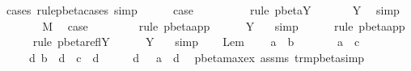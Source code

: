 \begin{isabellebody}
\ {\isacharparenleft}cases\ rule{\isacharcolon}pbeta{\isachardot}cases{\isacharcomma}\ simp{\isacharparenright}\isanewline
\ \ \ \ \isamarkupfalse%
\ {\isacharquery}case\ \isamarkupfalse%
\ {}\ {}\isanewline
\ \ \ \ \isamarkupfalse%
\ {\isacharparenleft}rule\ pbeta{\isachardot}Y{\isacharparenright}\isanewline
\ \ \ \ \isamarkupfalse%
\ {}\ Y\ \isamarkupfalse%
\ simp\isanewline
\ \ \isamarkupfalse%
\isanewline
\ \ \isamarkupfalse%
\ {\isacharparenleft}{}\ M{\isacharprime}{\isacharprime}{\isacharparenright}\ \isamarkupfalse%
\ {\isacharquery}case\ \isamarkupfalse%
\ {}\isanewline
\ \ \ \ \isamarkupfalse%
\ {\isacharparenleft}rule\ pbeta{\isachardot}app{\isacharparenright}\isanewline
\ \ \ \ \isamarkupfalse%
\ Y\ {}\ \isamarkupfalse%
\ simp\isanewline
\ \ \ \ \isamarkupfalse%
\ {\isacharparenleft}rule\ pbeta{\isachardot}app{\isacharparenright}\isanewline
\ \ \ \ \isamarkupfalse%
\ {\isacharparenleft}rule\ pbeta{\isachardot}reflY{\isacharparenright}\isanewline
\ \ \ \ \isamarkupfalse%
\ Y\ {}\ \isamarkupfalse%
\ simp\isanewline
\ \ \isamarkupfalse%
\isanewline
{}\isamarkupfalse%
%
\endisatagproof
{\isafoldproof}%
%
\isadelimproof
%
\endisadelimproof
%
\isamarkuptrue%
\isamarkupfalse%
\ Lem{}{\isacharunderscore}{}{\isacharunderscore}{}{\isacharcolon}\ \isanewline
\ \ \ {\isachardoublequoteopen}a\ {\isasymggreater}\ b{\isachardoublequoteclose}\isanewline
\ \ \ \ \ \ \ {\isachardoublequoteopen}a\ {\isasymggreater}\ c{\isachardoublequoteclose}\isanewline
\ \ \ \ \ {\isachardoublequoteopen}{\isasymexists}d{\isachardot}\ b\ {\isasymggreater}\ d\ {\isasymand}\ c\ {\isasymggreater}\ d{\isachardoublequoteclose}\isanewline
%
\isadelimproof
%
\endisadelimproof
%
\isatagproof
{}\isamarkupfalse%
\ {\isacharminus}\isanewline
\ \ \isamarkupfalse%
\ d\ \ {}{\isacharcolon}\ {\isachardoublequoteopen}a\ {\isachargreater}{\isachargreater}{\isachargreater}\ d{\isachardoublequoteclose}\ \isamarkupfalse%
\ pbeta{\isacharunderscore}max{\isacharunderscore}ex\ assms{\isacharparenleft}{}{\isacharparenright}\ trm{\isacharunderscore}pbeta{\isacharunderscore}simp{}\ \isamarkupfalse%

\end{isabellebody}
